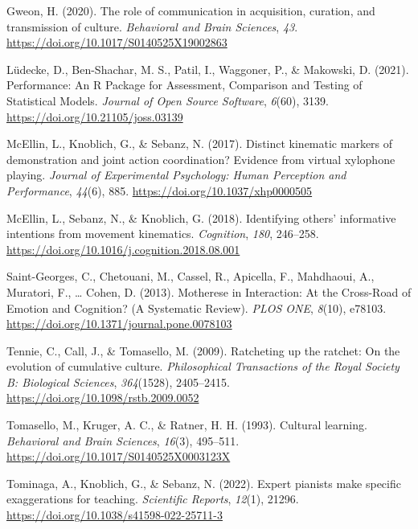 \documentclass[
  man,floatsintext]{apa6}
\newlength{\cslhangindent}
\newlength{\cslentryspacingunit} %
\newenvironment{CSLReferences}[2] %
 {%
  \setlength{\parindent}{0pt}
  \ifodd #1
  \let\oldpar\par
  \def\par{\hangindent=\cslhangindent\oldpar}
  \fi
  \setlength{\parskip}{#2\cslentryspacingunit}
 }%
 {}
\begin{document}
\begin{CSLReferences}{1}{0}
\leavevmode{}%
Gweon, H. (2020). The role of communication in acquisition, curation, and transmission of culture. \emph{Behavioral and Brain Sciences}, \emph{43}. \url{https://doi.org/10.1017/S0140525X19002863}

\leavevmode{}%
Lüdecke, D., Ben-Shachar, M. S., Patil, I., Waggoner, P., \& Makowski, D. (2021). Performance: {An R Package} for {Assessment}, {Comparison} and {Testing} of {Statistical Models}. \emph{Journal of Open Source Software}, \emph{6}(60), 3139. \url{https://doi.org/10.21105/joss.03139}

\leavevmode{}%
McEllin, L., Knoblich, G., \& Sebanz, N. (2017). Distinct kinematic markers of demonstration and joint action coordination? {Evidence} from virtual xylophone playing. \emph{Journal of Experimental Psychology: Human Perception and Performance}, \emph{44}(6), 885. \url{https://doi.org/10.1037/xhp0000505}

\leavevmode{}%
McEllin, L., Sebanz, N., \& Knoblich, G. (2018). Identifying others' informative intentions from movement kinematics. \emph{Cognition}, \emph{180}, 246--258. \url{https://doi.org/10.1016/j.cognition.2018.08.001}

\leavevmode{}%
Saint-Georges, C., Chetouani, M., Cassel, R., Apicella, F., Mahdhaoui, A., Muratori, F., \ldots{} Cohen, D. (2013). Motherese in {Interaction}: {At} the {Cross-Road} of {Emotion} and {Cognition}? ({A Systematic Review}). \emph{PLOS ONE}, \emph{8}(10), e78103. \url{https://doi.org/10.1371/journal.pone.0078103}

\leavevmode{}%
Tennie, C., Call, J., \& Tomasello, M. (2009). Ratcheting up the ratchet: On the evolution of cumulative culture. \emph{Philosophical Transactions of the Royal Society B: Biological Sciences}, \emph{364}(1528), 2405--2415. \url{https://doi.org/10.1098/rstb.2009.0052}

\leavevmode{}%
Tomasello, M., Kruger, A. C., \& Ratner, H. H. (1993). Cultural learning. \emph{Behavioral and Brain Sciences}, \emph{16}(3), 495--511. \url{https://doi.org/10.1017/S0140525X0003123X}

\leavevmode{}%
Tominaga, A., Knoblich, G., \& Sebanz, N. (2022). Expert pianists make specific exaggerations for teaching. \emph{Scientific Reports}, \emph{12}(1), 21296. \url{https://doi.org/10.1038/s41598-022-25711-3}


\end{CSLReferences}
\end{document}
